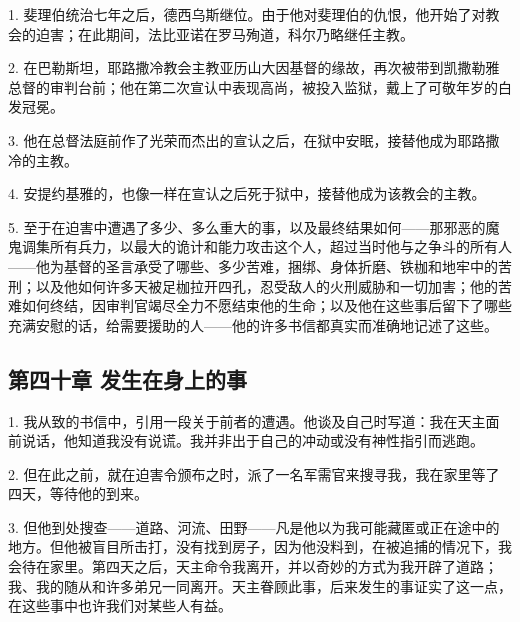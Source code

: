 1. 斐理伯统治七年之后，德西乌斯继位。由于他对斐理伯的仇恨，他开始了对教会的迫害；在此期间，法比亚诺在罗马殉道，科尔乃略继任主教。\par

2. 在巴勒斯坦，耶路撒冷教会主教亚历山大因基督的缘故，再次被带到凯撒勒雅总督的审判台前；他在第二次宣认中表现高尚，被投入监狱，戴上了可敬年岁的白发冠冕。\par

3. 他在总督法庭前作了光荣而杰出的宣认之后，在狱中安眠，接替他成为耶路撒冷的主教。\par

4. 安提约基雅的，也像一样在宣认之后死于狱中，接替他成为该教会的主教。\par

5. 至于在迫害中遭遇了多少、多么重大的事，以及最终结果如何——那邪恶的魔鬼调集所有兵力，以最大的诡计和能力攻击这个人，超过当时他与之争斗的所有人——他为基督的圣言承受了哪些、多少苦难，捆绑、身体折磨、铁枷和地牢中的苦刑；以及他如何许多天被足枷拉开四孔，忍受敌人的火刑威胁和一切加害；他的苦难如何终结，因审判官竭尽全力不愿结束他的生命；以及他在这些事后留下了哪些充满安慰的话，给需要援助的人——他的许多书信都真实而准确地记述了这些。\par


\subsection{第四十章 发生在身上的事}

1. 我从致的书信中，引用一段关于前者的遭遇。他谈及自己时写道：我在天主面前说话，他知道我没有说谎。我并非出于自己的冲动或没有神性指引而逃跑。\par

2. 但在此之前，就在迫害令颁布之时，派了一名军需官来搜寻我，我在家里等了四天，等待他的到来。\par

3. 但他到处搜查——道路、河流、田野——凡是他以为我可能藏匿或正在途中的地方。但他被盲目所击打，没有找到房子，因为他没料到，在被追捕的情况下，我会待在家里。第四天之后，天主命令我离开，并以奇妙的方式为我开辟了道路；我、我的随从和许多弟兄一同离开。天主眷顾此事，后来发生的事证实了这一点，在这些事中也许我们对某些人有益。\par


